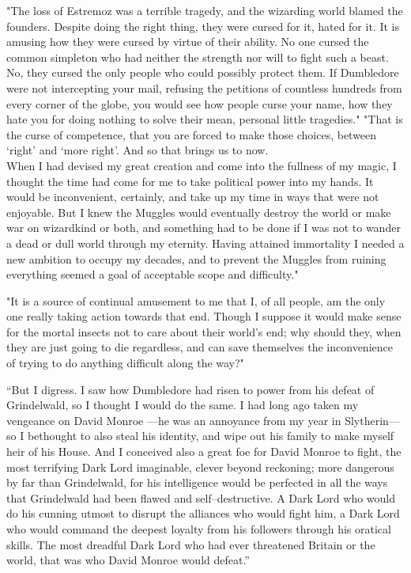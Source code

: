 "The loss of Estremoz was a terrible tragedy, and the wizarding world blamed the founders. Despite doing the right thing, they were cursed for it, hated for it. It is amusing how they were cursed by virtue of their ability. No one cursed the common simpleton who had neither the strength nor will to fight such a beast. No, they cursed the only people who could possibly protect them. If Dumbledore were not intercepting your mail, refusing the petitions of countless hundreds from every corner of the globe, you would see how people curse your name, how they hate you for doing nothing to solve their mean, personal little tragedies."
\SmallVSpace
"That is the curse of competence, that you are forced to make those choices, between ‘right’ and ‘more right’. And so that brings us to now.\\When I had devised my great creation and come into the fullness of my magic, I thought the time had come for me to take political power into my hands. It would be inconvenient, certainly, and take up my time in ways that were not enjoyable. But I knew the Muggles would eventually destroy the world or make war on wizardkind or both, and something had to be done if I was not to wander a dead or dull world through my eternity. Having attained immortality I needed a new ambition to occupy my decades, and to prevent the Muggles from ruining everything seemed a goal of acceptable scope and difficulty."

"It is a source of continual amusement to me that I, of all people, am the only one really taking action towards that end. Though I suppose it would make sense for the mortal insects not to care about their world’s end; why should they, when they are just going to die regardless, and can save themselves the inconvenience of trying to do anything difficult along the way?"

“But I digress. I saw how Dumbledore had risen to power from his defeat of Grindelwald, so I thought I would do the same. I had long ago taken my vengeance on David Monroe \mbox{---}he was an annoyance from my year in Slytherin\mbox{---} so I bethought to also steal his identity, and wipe out his family to make myself heir of his House. And I conceived also a great foe for David Monroe to fight, the most terrifying Dark Lord imaginable, clever beyond reckoning; more dangerous by far than Grindelwald, for his intelligence would be perfected in all the ways that Grindelwald had been flawed and self\mbox{--}destructive. A Dark Lord who would do his cunning utmost to disrupt the alliances who would fight him, a Dark Lord who would command the deepest loyalty from his followers through his oratical skills. The most dreadful Dark Lord who had ever threatened Britain or the world, that was who David Monroe would defeat.”

